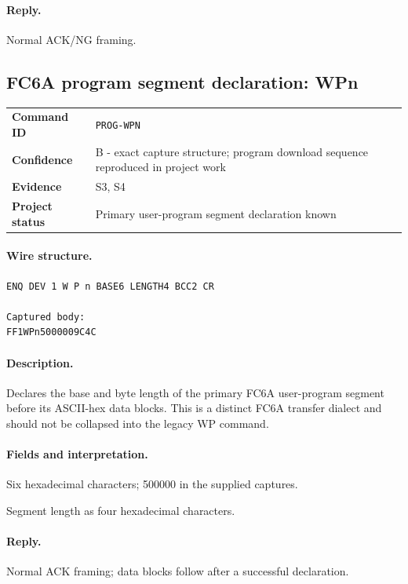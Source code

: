 \documentclass[10pt,letterpaper]{article}
\begin{document}
\paragraph{Reply.} Normal ACK/NG framing.

\subsection{FC6A program segment declaration: WPn}
\begin{tabularx}{\textwidth}{@{}>{\bfseries}p{2.8cm}X@{}}
Command ID & \texttt{PROG-WPN} \\
Confidence & B - exact capture structure; program download sequence reproduced in project work \\
Evidence & S3, S4 \\
Project status & Primary user-program segment declaration known \\
\end{tabularx}
\vspace{0.35em}
\paragraph{Wire structure.}
\begin{Verbatim}[breaklines=true,breakanywhere=true,fontsize=\small]
ENQ DEV 1 W P n BASE6 LENGTH4 BCC2 CR

Captured body:
FF1WPn5000009C4C
\end{Verbatim}
\paragraph{Description.} Declares the base and byte length of the primary FC6A user-program segment before its ASCII-hex data blocks. This is a distinct FC6A transfer dialect and should not be collapsed into the legacy WP command.
\paragraph{Fields and interpretation.}
\begin{description}[style=nextline,leftmargin=3.2cm,labelwidth=3.0cm,font=\normalfont\bfseries]
\item[BASE6] Six hexadecimal characters; 500000 in the supplied captures.
\item[LENGTH4] Segment length as four hexadecimal characters.
\end{description}
\paragraph{Reply.} Normal ACK framing; data blocks follow after a successful declaration.
\end{document}
